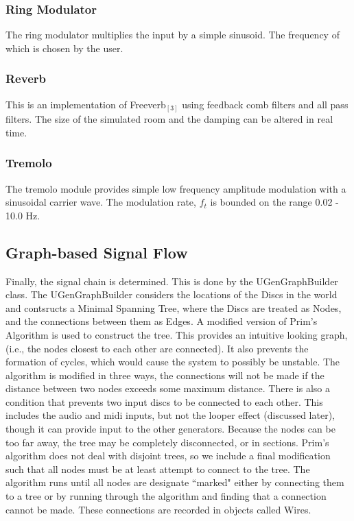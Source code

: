 \documentclass[pdftext,twoside,10pt]{article}
\begin{document}
\subsubsection*{Ring Modulator}
The ring modulator multiplies the input by a simple sinusoid. The frequency of which is chosen by the user.

\subsubsection*{Reverb}
This is an implementation of Freeverb$_{[3]}$ using feedback comb filters and all pass filters. The size of the simulated room and the damping can be altered in real time.

\subsubsection*{Tremolo} 
The tremolo module provides simple low frequency amplitude modulation with a sinusoidal carrier wave. The modulation rate, $f_t$ is bounded on the range 0.02 - 10.0 Hz.




\subsection{Graph-based Signal Flow}
Finally, the signal chain is determined. This is done by the UGenGraphBuilder class. The UGenGraphBuilder considers the locations of the Discs in the world and contsructs a Minimal Spanning Tree, where the Discs are treated as Nodes, and the connections between them as Edges. A modified version of Prim's Algorithm is used to construct the tree. This provides an intuitive looking graph, (i.e., the nodes closest to each other are connected). It also prevents the formation of cycles, which would cause the system to possibly be unstable. The algorithm is modified in three ways, the connections will not be made if the distance between two nodes exceeds some maximum distance. There is also a condition that prevents two input discs to be connected to each other. This includes the audio and midi inputs, but not the looper effect (discussed later), though it can provide input to the other generators. Because the nodes can be too far away, the tree may be completely disconnected, or in sections. Prim's algorithm does not deal with disjoint trees, so we include a final modification such that all nodes must be at least attempt to connect to the tree. The algorithm runs until all nodes are designate ``marked" either by connecting them to a tree or by running through the algorithm and finding that a connection cannot be made. These connections are recorded in objects called Wires.\\
\end{document}
